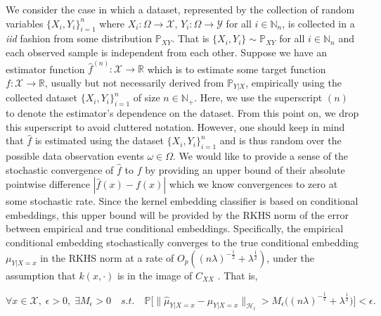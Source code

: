 \documentclass{article}
\begin{document}
	We consider the case in which a dataset, represented by the collection of random variables $\{X_{i}, Y_{i}\}_{i = 1}^{n}$ where $X_{i} : \Omega \to \mathcal{X}$,  $Y_{i} : \Omega \to \mathcal{Y}$ for all $i \in \mathbb{N}_{n}$, is collected in a \textit{iid} fashion from some distribution $\mathbb{P}_{X Y}$. That is $\{X_{i}, Y_{i}\} \sim \mathbb{P}_{X Y}$ for all $i \in \mathbb{N}_{n}$ and each observed sample is independent from each other. Suppose we have an estimator function $\hat{f}^{(n)} : \mathcal{X} \to \mathbb{R}$ which is to estimate some target function  $f : \mathcal{X} \to \mathbb{R}$, usually but not necessarily derived from $\mathbb{P}_{Y |X }$, empirically using the collected dataset $\{X_{i}, Y_{i}\}_{i = 1}^{n}$ of size $n \in \mathbb{N}_{+}$. Here, we use the superscript $(n)$ to denote the estimator's dependence on the dataset. From this point on, we drop this superscript to avoid cluttered notation. However, one should keep in mind that $\hat{f}$ is estimated using the dataset $\{X_{i}, Y_{i}\}_{i = 1}^{n}$ and is thus random over the possible data observation events $\omega \in \Omega$. We would like to provide a sense of the stochastic convergence of $\hat{f}$ to $f$ by providing an upper bound of their absolute pointwise difference $| \hat{f}(x) - f(x) |$ which we know convergences to zero at some stochastic rate. Since the kernel embedding classifier is based on conditional embeddings, this upper bound will be provided by the RKHS norm of the error between empirical and true conditional embeddings. Specifically, the empirical conditional embedding stochastically converges to the true conditional embedding $\mu_{Y | X = x}$ in the RKHS norm at a rate of $O_{p}((n \lambda)^{-\frac{1}{2}} + \lambda^{\frac{1}{2}})$, under the assumption that $k(x, \cdot)$ is in the image of $C_{XX}$ \citet[Theorem 6]{song2009hilbert}. That is,
	
		\begin{equation}
			\forall x \in \mathcal{X}, \; \epsilon > 0, \; \exists M_{\epsilon} > 0 \quad s.t. \quad \mathbb{P}\Big[\big\| \hat{\mu}_{Y | X = x} - \mu_{Y | X = x} \big\|_{\mathcal{H}_{l}} > M_{\epsilon} \Big((n \lambda)^{-\frac{1}{2}} + \lambda^{\frac{1}{2}}\Big)\Big] < \epsilon.
		\label{eq:empirical_conditional_embedding_stochastic_convergence}
		\end{equation}
	
\end{document}

